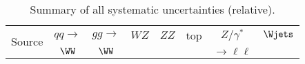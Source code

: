 \begin{table}[ht!]
\begin{center}
\caption{\label{tab:systww} Summary of all systematic uncertainties (relative).}
\vspace{5pt}
{\small
\begin{tabular}{l|c|c|c|c|c|c|c}%
\hline
\multirow{2}{*}{Source} & $qq \to$ & $gg \to$  & $WZ$ & $ZZ$  & top & $Z/\gamma^*$         & $\Wjets$ \\ %
                        & $\WW$    & $\WW$     &      &       &     & $\rightarrow\ell\ell$&          \\ %
\hline


\end{tabular}}
\end{center}
\end{table}
